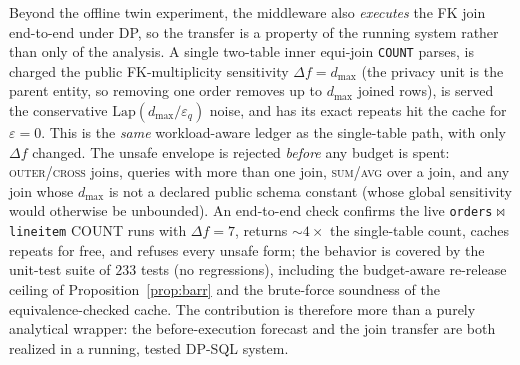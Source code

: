 \documentclass[sigconf,nonacm]{acmart}
\newcommand{\eps}{\varepsilon}
\newcommand{\Lap}{\mathrm{Lap}}
\begin{document}
Beyond the offline twin experiment, the middleware also \emph{executes} the FK join end-to-end under DP, so the transfer is a property of the running system rather than only of the analysis. A single two-table inner equi-join \texttt{COUNT} parses, is charged the public FK-multiplicity sensitivity $\Delta f{=}d_{\max}$ (the privacy unit is the parent entity, so removing one order removes up to $d_{\max}$ joined rows), is served the conservative $\Lap(d_{\max}/\eps_q)$ noise, and has its exact repeats hit the cache for $\eps{=}0$. This is the \emph{same} workload-aware ledger as the single-table path, with only $\Delta f$ changed. The unsafe envelope is rejected \emph{before} any budget is spent: \textsc{outer}/\textsc{cross} joins, queries with more than one join, \textsc{sum}/\textsc{avg} over a join, and any join whose $d_{\max}$ is not a declared public schema constant (whose global sensitivity would otherwise be unbounded). An end-to-end check confirms the live \texttt{orders}$\bowtie$\texttt{lineitem} COUNT runs with $\Delta f{=}7$, returns $\sim\!4\times$ the single-table count, caches repeats for free, and refuses every unsafe form; the behavior is covered by the unit-test suite of $233$ tests (no regressions), including the budget-aware re-release ceiling of Proposition~\ref{prop:barr} and the brute-force soundness of the equivalence-checked cache. The contribution is therefore more than a purely analytical wrapper: the before-execution forecast and the join transfer are both realized in a running, tested DP-SQL system.
\end{document}
